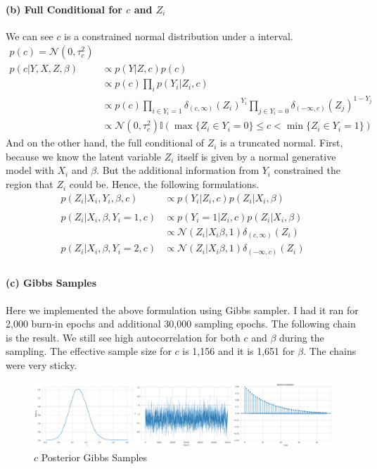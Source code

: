 \documentclass[11pt, letterpaper]{article}
\begin{document}
\paragraph{(b) Full Conditional for $c$ and $Z_i$}
We can see $c$ is a constrained normal distribution under a interval.
\begin{align*}
    p(c) = \mathcal{N}(0, \tau_c^2) \\
    p(c|Y, X, Z, \beta) &\propto p(Y|Z, c) p(c) \\
        &\propto p(c) \prod_i p(Y_i|Z_i, c) \\
        &\propto p(c) \prod_{i \in Y_i=1} \delta_{(c,\infty)}(Z_i)^{Y_i} \prod_{j \in Y_i=0} \delta_{(-\infty,c)}(Z_j)^{1-Y_j} \\
        &\propto \mathcal{N}(0, \tau_c^2) \mathbb{I}(\max\{Z_i \in Y_i=0\} \leq c < \min\{Z_i \in Y_i=1\}) 
\end{align*}
And on the other hand, the full conditional of $Z_i$ is a truncated normal. First, because we know the latent variable $Z_i$ itself is given by a normal generative model with $X_i$ and $\beta$. But the additional information from $Y_i$ constrained the region that $Z_i$ could be. Hence, the following formulations.
\begin{align*}
    p(Z_i|X_i,Y_i,\beta,c) &\propto p(Y_i|Z_i, c) p(Z_i|X_i, \beta) \\ \\
    p(Z_i|X_i,\beta,Y_i=1,c) &\propto p(Y_i=1|Z_i, c) p(Z_i|X_i, \beta) \\
        &\propto \mathcal{N}(Z_i|X_i\beta, 1)\delta_{(c,\infty)}(Z_i) \\
    p(Z_i|X_i,\beta,Y_i=2,c) &\propto \mathcal{N}(Z_i|X_i\beta, 1)\delta_{(-\infty,c)}(Z_i) \\
\end{align*}

\paragraph{(c) Gibbs Samples}
Here we implemented the above formulation using Gibbs sampler. I had it ran for 2,000 burn-in epochs and additional 30,000 sampling epochs. The following chain is the result. We still see high autocorrelation for both $c$ and $\beta$ during the sampling. The effective sample size for $c$ is 1,156 and it is 1,651 for $\beta$. The chains were very sticky.
\begin{figure}[!h]
  \centering
  \includegraphics[width=1.0\textwidth]{6.3.3(1).png}
  \captionsetup{justification=centering}
  \caption{$c$ Posterior Gibbs Samples}
\end{figure}
\end{document}
